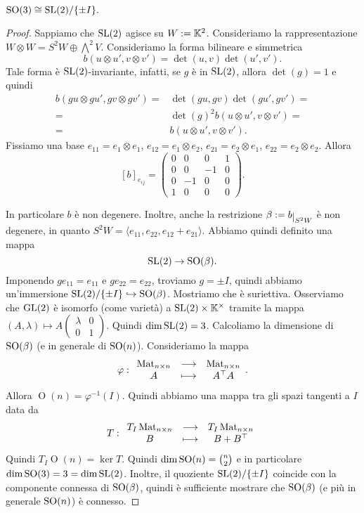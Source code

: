 \begin{proposition}
$\operatorname{SO}(3)\cong \mathrm{SL}(2)/\{\pm I\}.$
\end{proposition}
\begin{proof}
Sappiamo che $\mathrm{SL}(2)$ agisce su $W:= \mathbb{K}^2$. Consideriamo la rappresentazione $W\otimes W=S^2 W \oplus \bigwedge^2 V$. 
Consideriamo la forma bilineare e simmetrica 
\[b(u\otimes u', v \otimes v')=\det(u,v)\det(u',v').\] 
Tale forma è $\mathrm{SL}(2)$-invariante, infatti, se $g$ è in $\mathrm{SL}(2)$, allora $\det(g)=1$ e quindi
\begin{align*}
	b(gu\otimes gu', gv \otimes gv')=&\det(gu,gv)\det(gu',gv')=\\
	=&\det(g)^2b(u\otimes u', v \otimes v')=\\
	=&b(u\otimes u', v \otimes v').
\end{align*}
Fissiamo una base $e_{11}=e_1\otimes e_1$, $e_{12}=e_1\otimes e_2$, $e_{21}=e_2\otimes e_1$, $e_{22}=e_2\otimes e_2$. Allora \[[b]_{e_{ij}}=\begin{pmatrix}
    0 & 0 & 0 & 1 \\
    0 &0 & -1 & 0 \\
    0 & -1 & 0&0 \\
    1 &0&0&0
\end{pmatrix}.\]

In particolare $b$ è non degenere. Inoltre, anche la restrizione $\beta \coloneqq b\res{S^2W}$ è non degenere, in quanto $S^2W=\langle e_{11},e_{22},e_{12}+e_{21}\rangle$. Abbiamo quindi definito una mappa 
\[\mathrm{SL}(2)\to \operatorname{SO}(\beta).\] 
Imponendo $g e_{11}=e_{11}$ e $g e_{22}=e_{22}$, troviamo $g=\pm I$, quindi abbiamo un'immersione $\mathrm{SL}(2)/\{\pm I\}\hookrightarrow \operatorname{SO}(\beta)$. Mostriamo che è suriettiva. Osserviamo che $\mathrm{GL}(2)$ è isomorfo (come varietà) a $\mathrm{SL}(2)\times \mathbb{K}^\times$ tramite la mappa $(A,\lambda)\mapsto A \begin{pmatrix}
    \lambda & 0 \\ 0 & 1
\end{pmatrix}$. Quindi $\dim\mathrm{SL}(2)=3$. Calcoliamo la dimensione di $\operatorname{SO}(\beta)$ (e in generale di $\operatorname{SO}(n)$). Consideriamo la mappa 
\[\varphi:\begin{array}{ccc} {\operatorname{Mat}_{n\times n}} & \longrightarrow & {\operatorname{Mat}_{n\times n}}\\ {A} & \longmapsto & {A^\top A} \end{array}.\] 
Allora $\operatorname{O}(n)=\varphi^{-1}(I)$. Quindi abbiamo una mappa tra gli spazi tangenti a $I$ data da 
\[T:\begin{array}{ccc} {T_I\operatorname{Mat}_{n\times n}} & \longrightarrow & {T_I\operatorname{Mat}_{n\times n}}\\ {B} & \longmapsto & {B+B^\top} \end{array}\]
Quindi $T_I\operatorname{O}(n)=\ker T$. Quindi $\dim\operatorname{SO}(n)=\binom{n}{2}$ e in particolare $\dim\operatorname{SO}(3)=3=\dim\mathrm{SL}(2)$.  Inoltre, il quoziente $\mathrm{SL}(2)/\{\pm I\}$ coincide con la componente connessa di $\operatorname{SO}(\beta)$, quindi è sufficiente mostrare che $\operatorname{SO}(\beta)$ (e più in generale $\operatorname{SO}(n)$) è connesso. 


\end{proof}
